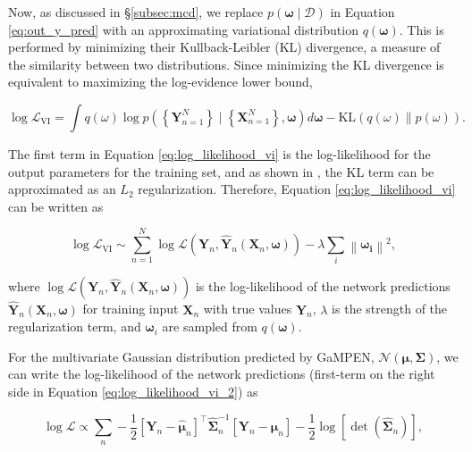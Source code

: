 \documentclass[twocolumn]{aastex63}
\newcommand\gampen{GaMPEN}
\begin{document}
\begin{CJK*}{UTF8}{gbsn}
Now, as discussed in \S \ref{subsec:mcd}, we replace $p(\boldsymbol{\omega} \mid \mathcal{D})$ in Equation \ref{eq:out_y_pred} with an approximating variational distribution $q(\boldsymbol{\omega})$. This is performed by minimizing their Kullback-Leibler (KL) divergence, a measure of the similarity between two distributions. Since minimizing the KL divergence is equivalent to maximizing the log-evidence lower bound,

\begin{equation}
\log \mathcal{L}_{\mathrm{VI}}= \int q(\omega) \log p( \left\{\boldsymbol{Y}_{n=1}^{N}\right\} \mid \left\{\boldsymbol{X}_{n=1}^N\right\}, \boldsymbol{\omega}) d \boldsymbol{\omega}  - \mathrm{KL}(q(\omega) \| p(\omega)) .
\label{eq:log_likelihood_vi}
\end{equation}

\noindent
The first term in Equation \ref{eq:log_likelihood_vi} is the log-likelihood for the output parameters for the training set, and as shown in \cite{gal_2016}, the KL term can be approximated as an $L_2$ regularization. Therefore, Equation \ref{eq:log_likelihood_vi} can be written as 

\begin{equation}
\log \mathcal{L}_{\mathrm{VI}} \sim \sum_{n=1}^{N} \log \mathcal{L}\left(\boldsymbol{Y}_{n}, \boldsymbol{\hat{Y}}_{n}\left(\boldsymbol{X}_{n}, \boldsymbol{\omega}\right)\right)-\lambda \sum_{i}\left\|\boldsymbol{\omega_{i}}\right\|^{2} ,
\label{eq:log_likelihood_vi_2}
\end{equation}

\noindent
where $\log \mathcal{L}\left(\boldsymbol{Y}_{n}, \boldsymbol{\hat{Y}}_{n}\left(\boldsymbol{X}_{n}, \boldsymbol{\omega}\right)\right)$ is the log-likelihood of the network predictions $\boldsymbol{\hat{Y}}_{n}\left(\boldsymbol{X}_{n}, \boldsymbol{\omega}\right)$ for training input $\boldsymbol{X}_n$ with true values $\boldsymbol{Y}_n$, $\lambda$ is the strength of the regularization term, and $\boldsymbol{\omega}_i$ are sampled from $q(\boldsymbol{\omega})$. 

For the multivariate Gaussian distribution predicted by \gampen{}, $\mathcal{N}(\boldsymbol{\mu}, \boldsymbol{\Sigma})$, we can write the log-likelihood of the network predictions (first-term on the right side in Equation \ref{eq:log_likelihood_vi_2}) as 

\begin{equation}
\log \mathcal{L} \propto  \sum_{n}  -\frac{1}{2}\left[\boldsymbol{Y}_{n}-\boldsymbol{\hat{\mu}}_{n}\right]^{\top} \boldsymbol{\hat{\Sigma}}_n^{-1}\left[\boldsymbol{Y}_{n}-\boldsymbol{\hat{\mu}}_{n}\right] -\frac{1}{2} \log [\operatorname{det}(\boldsymbol{\hat{\Sigma}}_n)] ,
\label{eq:effective_log_likelihood}
\end{equation}


\end{CJK*}
\end{document}
